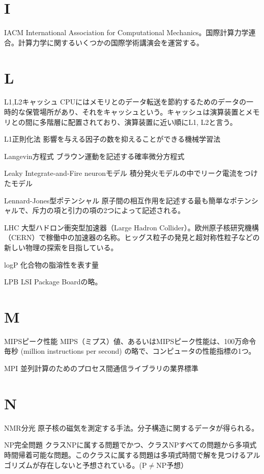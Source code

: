 \begin{用語集}
\section{I}
\item{IACM}{}
{International Association for Computational Mechanics。国際計算力学連合。計算力学に関するいくつかの国際学術講演会を運営する。}
\section{L}
\item{L1,L2キャッシュ}{}
{CPUにはメモリとのデータ転送を節約するためのデータの一時的な保管場所があり、それをキャッシュという。キャッシュは演算装置とメモリとの間に多階層に配置されており、演算装置に近い順にL1, L2と言う。}
\item{L1正則化法}{}
{影響を与える因子の数を抑えることができる機械学習法}
\item{Langevin方程式}{}
{ブラウン運動を記述する確率微分方程式}
\item{Leaky Integrate-and-Fire neuronモデル}{}
{積分発火モデルの中でリーク電流をつけたモデル}
\item{Lennard-Jones型ポテンシャル}{}
{原子間の相互作用を記述する最も簡単なポテンシャルで、斥力の項と引力の項の2つによって記述される。}
\item{LHC}{}
{大型ハドロン衝突型加速器（Large Hadron Collider）。欧州原子核研究機構（CERN）で稼働中の加速器の名称。ヒッグス粒子の発見と超対称性粒子などの新しい物理の探索を目指している。}
\item{logP}{}
{化合物の脂溶性を表す量}
\item{LPB}{}
{LSI Package Boardの略。}
\section{M}
\item{MIPSピーク性能}{}
{MIPS（ミプス）値、あるいはMIPSピーク性能は、100万命令毎秒 (million instructions per second) の略で、コンピュータの性能指標の1つ。}
\item{MPI}{}
{並列計算のためのプロセス間通信ライブラリの業界標準}
\section{N}
\item{NMR分光}{}
{原子核の磁気を測定する手法。分子構造に関するデータが得られる。}
\item{NP完全問題}{}
{クラスNPに属する問題でかつ、クラスNPすべての問題から多項式時間帰着可能な問題。このクラスに属する問題は多項式時間で解を見つけるアルゴリズムが存在しないと予想されている。(P${\neq}$NP予想）}

\end{用語集}
